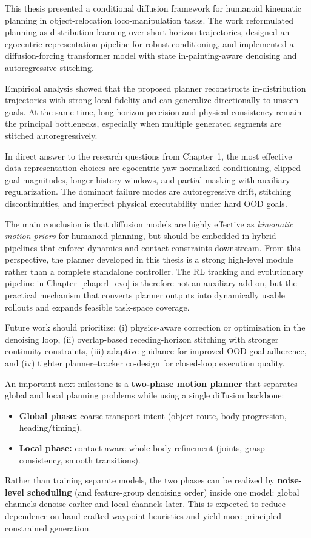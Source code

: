 This thesis presented a conditional diffusion framework for humanoid kinematic planning in object-relocation loco-manipulation tasks. The work reformulated planning as distribution learning over short-horizon trajectories, designed an egocentric representation pipeline for robust conditioning, and implemented a diffusion-forcing transformer model with state in-painting-aware denoising and autoregressive stitching.

Empirical analysis showed that the proposed planner reconstructs in-distribution trajectories with strong local fidelity and can generalize directionally to unseen goals. At the same time, long-horizon precision and physical consistency remain the principal bottlenecks, especially when multiple generated segments are stitched autoregressively.

In direct answer to the research questions from Chapter~1, the most effective data-representation choices are egocentric yaw-normalized conditioning, clipped goal magnitudes, longer history windows, and partial masking with auxiliary regularization. The dominant failure modes are autoregressive drift, stitching discontinuities, and imperfect physical executability under hard OOD goals.

The main conclusion is that diffusion models are highly effective as \emph{kinematic motion priors} for humanoid planning, but should be embedded in hybrid pipelines that enforce dynamics and contact constraints downstream. From this perspective, the planner developed in this thesis is a strong high-level module rather than a complete standalone controller. The RL tracking and evolutionary pipeline in Chapter~\ref{chap:rl_evo} is therefore not an auxiliary add-on, but the practical mechanism that converts planner outputs into dynamically usable rollouts and expands feasible task-space coverage.

Future work should prioritize: (i) physics-aware correction or optimization in the denoising loop, (ii) overlap-based receding-horizon stitching with stronger continuity constraints, (iii) adaptive guidance for improved OOD goal adherence, and (iv) tighter planner--tracker co-design for closed-loop execution quality.

An important next milestone is a \textbf{two-phase motion planner} that separates global and local planning problems while using a single diffusion backbone:
\begin{itemize}
	\item \textbf{Global phase:} coarse transport intent (object route, body progression, heading/timing).
	\item \textbf{Local phase:} contact-aware whole-body refinement (joints, grasp consistency, smooth transitions).
\end{itemize}
Rather than training separate models, the two phases can be realized by \textbf{noise-level scheduling} (and feature-group denoising order) inside one model: global channels denoise earlier and local channels later. This is expected to reduce dependence on hand-crafted waypoint heuristics and yield more principled constrained generation.

